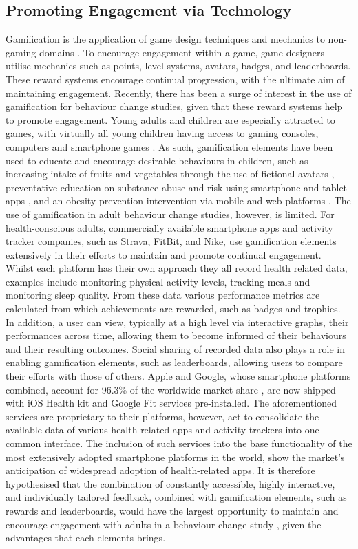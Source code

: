 \subsection{Promoting Engagement via Technology}
Gamification is the application of game design techniques and mechanics to non-gaming domains \cite{Deterding2011}. To encourage engagement within a game, game designers utilise mechanics such as points, level-systems, avatars, badges, and leaderboards. These reward systems encourage continual progression, with the ultimate aim of maintaining engagement. Recently, there has been a surge of interest in the use of gamification for behaviour change studies, given that these reward systems help to promote engagement. Young adults and children are especially attracted to games, with virtually all young children having access to gaming consoles, computers and smartphone games \cite{Schoech2013}. As such, gamification elements have been used to educate and encourage desirable behaviours in children, such as increasing intake of fruits and vegetables through the use of fictional avatars \cite{Jones2014}, preventative education on substance-abuse and risk using smartphone and tablet apps \cite{Fiellin2014}, and an obesity prevention intervention via mobile and web platforms \cite{Delisle2015}. The use of gamification in adult behaviour change studies, however, is limited.
For health-conscious adults, commercially available smartphone apps and activity tracker companies, such as Strava, FitBit, and Nike, use gamification elements extensively in their efforts to maintain and promote continual engagement. Whilst each platform has their own approach they all record health related data, examples include monitoring physical activity levels, tracking meals and monitoring sleep quality. From these data various performance metrics are calculated from which achievements are rewarded, such as badges and trophies. In addition, a user can view, typically at a high level via interactive graphs, their performances across time, allowing them to become informed of their behaviours and their resulting outcomes. Social sharing of recorded data also plays a role in enabling gamification elements, such as leaderboards, allowing users to compare their efforts with those of others. Apple and Google, whose smartphone platforms combined, account for 96.3\% of the worldwide market share \cite{InternationalDataCorporation2015}, are now shipped with iOS Health kit and Google Fit services pre-installed. The aforementioned services are proprietary to their platforms, however, act to consolidate the available data of various health-related apps and activity trackers into one common interface. The inclusion of such services into the base functionality of the most extensively adopted smartphone platforms in the world, show the market’s anticipation of widespread adoption of health-related apps.
It is therefore hypothesised that the combination of constantly accessible, highly interactive, and individually tailored feedback, combined with gamification elements, such as rewards and leaderboards, would have the largest opportunity to maintain and encourage engagement with adults in a behaviour change study \cite{Middelweerd2014}, given the advantages that each elements brings.

